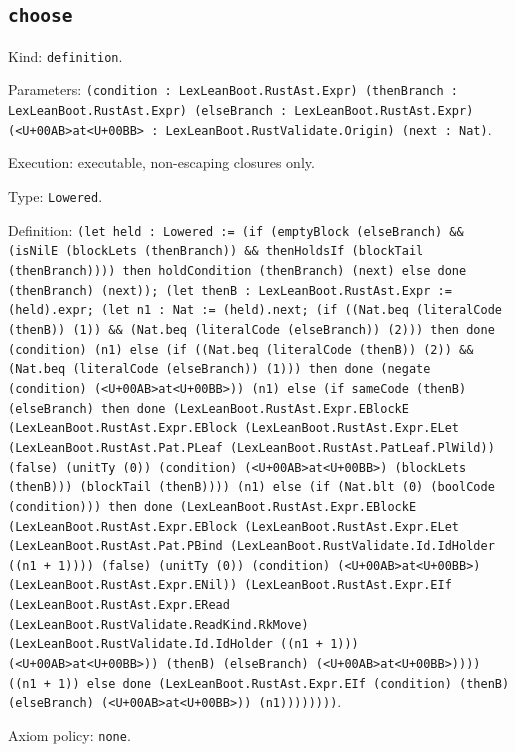 \documentclass[11pt]{article}
\begin{document}
\subsection*{\texttt{choose}}
\noindent Kind: \texttt{definition}.\par
\noindent Parameters: \texttt{(condition : LexLeanBoot.RustAst.Expr) (thenBranch : LexLeanBoot.RustAst.Expr) (elseBranch : LexLeanBoot.RustAst.Expr) (<U+00AB>at<U+00BB> : LexLeanBoot.RustValidate.Origin) (next : Nat)}.\par
\noindent Execution: executable, non-escaping closures only.\par
\noindent Type: \texttt{Lowered}.\par
\noindent Definition: \texttt{(let held : Lowered := (if (emptyBlock (elseBranch) \&\& (isNilE (blockLets (thenBranch)) \&\& thenHoldsIf (blockTail (thenBranch)))) then holdCondition (thenBranch) (next) else done (thenBranch) (next)); (let thenB : LexLeanBoot.RustAst.Expr := (held).expr; (let n1 : Nat := (held).next; (if ((Nat.beq (literalCode (thenB)) (1)) \&\& (Nat.beq (literalCode (elseBranch)) (2))) then done (condition) (n1) else (if ((Nat.beq (literalCode (thenB)) (2)) \&\& (Nat.beq (literalCode (elseBranch)) (1))) then done (negate (condition) (<U+00AB>at<U+00BB>)) (n1) else (if sameCode (thenB) (elseBranch) then done (LexLeanBoot.RustAst.Expr.EBlockE (LexLeanBoot.RustAst.Expr.EBlock (LexLeanBoot.RustAst.Expr.ELet (LexLeanBoot.RustAst.Pat.PLeaf (LexLeanBoot.RustAst.PatLeaf.PlWild)) (false) (unitTy (0)) (condition) (<U+00AB>at<U+00BB>) (blockLets (thenB))) (blockTail (thenB)))) (n1) else (if (Nat.blt (0) (boolCode (condition))) then done (LexLeanBoot.RustAst.Expr.EBlockE (LexLeanBoot.RustAst.Expr.EBlock (LexLeanBoot.RustAst.Expr.ELet (LexLeanBoot.RustAst.Pat.PBind (LexLeanBoot.RustValidate.Id.IdHolder ((n1 + 1)))) (false) (unitTy (0)) (condition) (<U+00AB>at<U+00BB>) (LexLeanBoot.RustAst.Expr.ENil)) (LexLeanBoot.RustAst.Expr.EIf (LexLeanBoot.RustAst.Expr.ERead (LexLeanBoot.RustValidate.ReadKind.RkMove) (LexLeanBoot.RustValidate.Id.IdHolder ((n1 + 1))) (<U+00AB>at<U+00BB>)) (thenB) (elseBranch) (<U+00AB>at<U+00BB>)))) ((n1 + 1)) else done (LexLeanBoot.RustAst.Expr.EIf (condition) (thenB) (elseBranch) (<U+00AB>at<U+00BB>)) (n1))))))))}.\par
\noindent Axiom policy: \texttt{none}.\par
\end{document}
